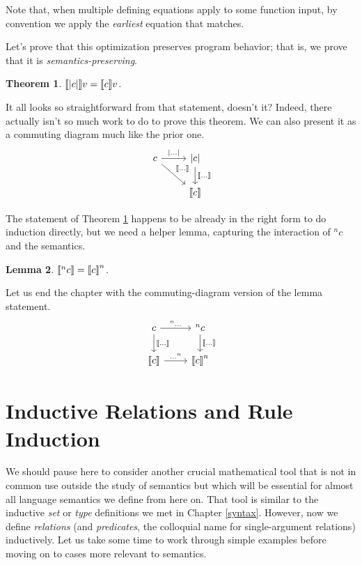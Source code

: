 \documentclass{amsbook}
\newtheorem{theorem}{Theorem}[chapter]
\newtheorem{lemma}[theorem]{Lemma}
\theoremstyle{definition}
\theoremstyle{remark}
\numberwithin{section}{chapter}
\numberwithin{equation}{chapter}
\begin{document}
Note that, when multiple defining equations apply to some function input, by convention we apply the \emph{earliest} equation that matches.

Let's prove that this optimization preserves program behavior; that is, we prove that it is \emph{semantics-preserving}.

\begin{theorem}\label{unroll}
  ${\left \llbracket {\left | c \right |} \right \rrbracket}v = {\left \llbracket c \right \rrbracket}v$.
\end{theorem}

It all looks so straightforward from that statement, doesn't it?
Indeed, there actually isn't so much work to do to prove this theorem.
We can also present it as a commuting diagram much like the prior one.
\[
\begin{tikzcd}
c \arrow{r}{\opt{\ldots}} \arrow{dr}{\denote{\ldots}} & \opt{c} \arrow{d}{\denote{\ldots}} \\
& \denote{c}
\end{tikzcd}
\]

The statement of Theorem \ref{unroll} happens to be already in the right form to do induction directly, but we need a helper lemma, capturing the interaction of $^nc$ and the semantics.

\begin{lemma}
  ${\left \llbracket ^nc \right \rrbracket} = {\left \llbracket c \right \rrbracket}^n$.
\end{lemma}

Let us end the chapter with the commuting-diagram version of the lemma statement.
\[
\begin{tikzcd}
c \arrow{r}{^n\ldots} \arrow{d}{\denote{\ldots}} & ^nc \arrow{d}{\denote{\ldots}} \\
\denote{c} \arrow{r}{\ldots^n} & \denote{c}^n
\end{tikzcd}
\]



\chapter{Inductive Relations and Rule Induction}\label{rule_induction}

We should pause here to consider another crucial mathematical tool that is not in common use outside the study of semantics but which will be essential for almost all language semantics we define from here on.
That tool is similar to the inductive \emph{set} or \emph{type} definitions we met in Chapter \ref{syntax}.
However, now we define \emph{relations} (and \emph{predicates}, the colloquial name for single-argument relations) inductively.
Let us take some time to work through simple examples before moving on to cases more relevant to semantics.
\end{document}
